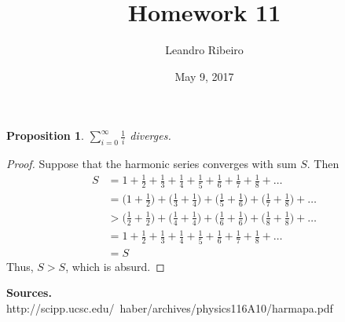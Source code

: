 \documentclass[12pt]{amsart}
\begin{document}
\title{Homework 11}
\date{May 9, 2017}
\author{Leandro Ribeiro}

\maketitle

\newtheorem*{prop}{Proposition}

\begin{prop}
	$\displaystyle{\sum\limits_{i=0}^{\infty}\frac{1}{i}}$ diverges.
\end{prop}

\begin{proof}
	Suppose that the harmonic series converges with sum $S$. Then
	\begin{equation*}
	\begin{split}
	S &= 1 + \frac{1}{2} + \frac{1}{3} + \frac{1}{4} + \frac{1}{5} + \frac{1}{6} + \frac{1}{7} + \frac{1}{8} + \dots
	 \\ &= \Bigg(1 + \frac{1}{2}\Bigg) + \Bigg(\frac{1}{3} + \frac{1}{4}\Bigg) + \Bigg(\frac{1}{5} + \frac{1}{6}\Bigg) + \Bigg(\frac{1}{7} + \frac{1}{8}\Bigg) + \dots
	 \\ &> \Bigg(\frac{1}{2} + \frac{1}{2}\Bigg) + \Bigg(\frac{1}{4} + \frac{1}{4}\Bigg) + \Bigg(\frac{1}{6} + \frac{1}{6}\Bigg) + \Bigg(\frac{1}{8} + \frac{1}{8}\Bigg) + \dots
	 \\ &= 1 + \frac{1}{2} + \frac{1}{3} + \frac{1}{4} + \frac{1}{5} + \frac{1}{6} + \frac{1}{7} + \frac{1}{8} + \dots
	 \\ &= S
	\end{split}
	\end{equation*}
	\indent Thus, $S > S$, which is absurd.
\end{proof}

\noindent\textbf{Sources.}
\\http://scipp.ucsc.edu/~haber/archives/physics116A10/harmapa.pdf
\end{document}
